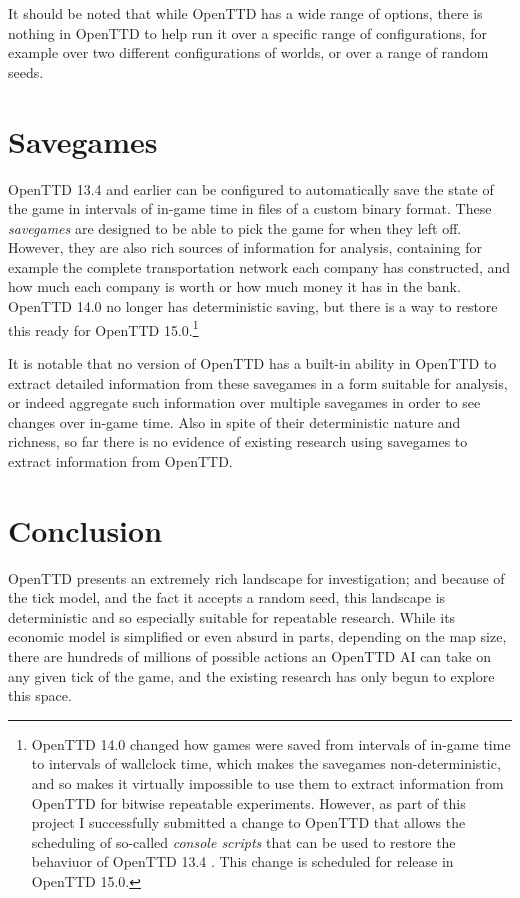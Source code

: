 \documentclass[logo,msc,dsti]{style/infthesis}    %
\begin{document}
{It should be noted that while OpenTTD has a wide range of options, there is nothing in OpenTTD to help run it over a specific range of configurations, for example over two different configurations of worlds, or over a range of random seeds.

\section{Savegames}

OpenTTD 13.4 and earlier can be configured to automatically save the state of the game in intervals of in-game time in files of a custom binary format. These \emph{savegames} are designed to be able to pick the game for when they left off. However, they are also rich sources of information for analysis, containing for example the complete transportation network each company has constructed, and how much each company is worth or how much money it has in the bank. OpenTTD 14.0 no longer has deterministic saving, but there is a way to restore this ready for OpenTTD 15.0.\footnote{OpenTTD 14.0 changed how games were saved from intervals of in-game time to intervals of wallclock time, which makes the savegames non-deterministic, and so makes it virtually impossible to use them to extract information from OpenTTD for bitwise repeatable experiments. However, as part of this project I successfully submitted a change to OpenTTD that allows the scheduling of so-called \emph{console scripts} that can be used to restore the behaviuor of OpenTTD 13.4 \cite{OpenTTDScheduleScript}. This change is scheduled for release in OpenTTD 15.0.}

It is notable that no version of OpenTTD has a built-in ability in OpenTTD to extract detailed information from these savegames in a form suitable for analysis, or indeed aggregate such information over multiple savegames in order to see changes over in-game time. Also in spite of their deterministic nature and richness, so far there is no evidence of existing research using savegames to extract information from OpenTTD.

\section{Conclusion}

OpenTTD presents an extremely rich landscape for investigation; and because of the tick model, and the fact it accepts a random seed, this landscape is deterministic and so especially suitable for repeatable research. While its economic model is simplified or even absurd in parts, depending on the map size, there are hundreds of millions of possible actions an OpenTTD AI can take on any given tick of the game, and the existing research has only begun to explore this space.

}
\end{document}
